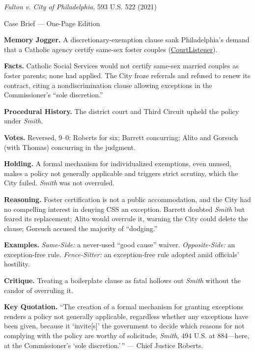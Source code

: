 \documentclass[12pt]{article}
\begin{document}
\begin{center}
{\Large \textit{Fulton v. City of Philadelphia}, 593 U.S. 522 (2021)\par}
\vspace{0.3em}
{\normalsize Case Brief --- One-Page Edition\par}
\end{center}

\textbf{Memory Jogger.} A discretionary-exemption clause sank Philadelphia's demand that a Catholic agency certify same-sex foster couples (\href{https://www.courtlistener.com/opinion/4892570/fulton-v-philadelphia/}{CourtListener}).

\textbf{Facts.} Catholic Social Services would not certify same-sex married couples as foster parents; none had applied. The City froze referrals and refused to renew its contract, citing a nondiscrimination clause allowing exceptions in the Commissioner's ``sole discretion.''

\textbf{Procedural History.} The district court and Third Circuit upheld the policy under \textit{Smith}.

\textbf{Votes.} Reversed, 9--0: Roberts for six; Barrett concurring; Alito and Gorsuch (with Thomas) concurring in the judgment.

\textbf{Holding.} A formal mechanism for individualized exemptions, even unused, makes a policy not generally applicable and triggers strict scrutiny, which the City failed. \textit{Smith} was not overruled.

\textbf{Reasoning.} Foster certification is not a public accommodation, and the City had no compelling interest in denying CSS an exception. Barrett doubted \textit{Smith} but feared its replacement; Alito would overrule it, warning the City could delete the clause; Gorsuch accused the majority of ``dodging.''

\textbf{Examples.} \emph{Same-Side:} a never-used ``good cause'' waiver. \emph{Opposite-Side:} an exception-free rule. \emph{Fence-Sitter:} an exception-free rule adopted amid officials' hostility.

\textbf{Critique.} Treating a boilerplate clause as fatal hollows out \textit{Smith} without the candor of overruling it.

\textbf{Key Quotation.} ``The creation of a formal mechanism for granting exceptions renders a policy not generally applicable, regardless whether any exceptions have been given, because it `invite[s]' the government to decide which reasons for not complying with the policy are worthy of solicitude, \textit{Smith}, 494 U.S. at 884---here, at the Commissioner's `sole discretion.'\,'' --- Chief Justice Roberts.
\end{document}
